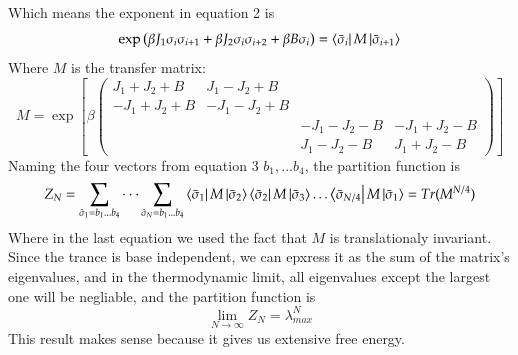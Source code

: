 \documentclass{article}
\begin{document}
Which means the exponent in equation 2 is
\begin{equation}
    \exp\left(
        \beta J_1 \sigma_i \sigma_{i+1} +
        \beta J_2 \sigma_i \sigma_{i+2} +
        \beta B \sigma_i
    \right) = \bra{\bar{\sigma}_i}M\ket{\bar{\sigma}_{i+1}}
\end{equation}
Where $M$ is the transfer matrix:
\begin{equation}
    M = \exp \left[\beta \begin{pmatrix}
        J_1 + J_2 + B & J_1 - J_2 + B & & \\
        -J_1 + J_2 + B & -J_1 - J_2 + B & & \\
        & & -J_1 - J_2 - B & -J_1 + J_2 - B \\
        & & J_1 - J_2 - B & J_1 + J_2 - B
    \end{pmatrix}\right]
\end{equation}
Naming the four vectors from equation 3 $b_1, ... b_4$, the partition function is
\begin{equation}
    Z_N = \sum_{\hat{\sigma}_1 = b_1 ... b_4} \cdot\cdot\cdot \sum_{\hat{\sigma}_N = b_1 ... b_4}
    \bra{\bar{\sigma}_1}M\ket{\bar{\sigma}_2}
    \bra{\bar{\sigma}_2}M\ket{\bar{\sigma}_3}
    \dots
    \bra{\bar{\sigma}_{N/4}}M\ket{\bar{\sigma}_1} = Tr(M^{N/4})
\end{equation}
Where in the last equation we used the fact that $M$ is translationaly invariant. Since the trance is base independent, we can epxress it as the sum of the matrix's eigenvalues, and in the thermodynamic limit, all eigenvalues except the largest one will be negliable, and the partition function is
\begin{equation}
    \lim_{N\rightarrow \infty} Z_N = \lambda_{max}^N
\end{equation}
This result makes sense because it gives us extensive free energy.
\end{document}
